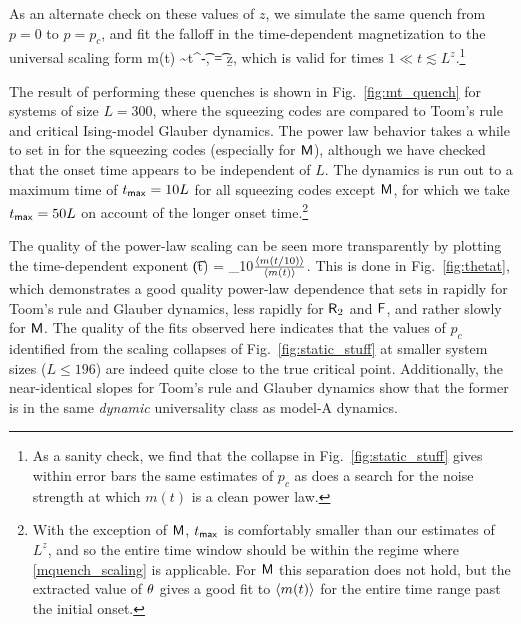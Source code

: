 \documentclass[pra,aps,twocolumn,groupedaddress,superscriptaddress,nofootinbib,preprintnumbers]{revtex4-2}
\begin{document}
		As an alternate check on these values of $z$,  we simulate the same quench from $p=0$ to $p=p_c$, and fit the falloff in the time-dependent magnetization to the universal scaling form \cite{janssen1989new,hinrichsen2000non}
	\be\label{mquench_scaling}  m(t)  \sim t^{-\t}, \qq \t = \frac\b{\nu z},\ee
	which is valid for times $1 \ll t \lesssim L^z$.\footnote{As a sanity check, we find that the collapse in Fig.~\ref{fig:static_stuff} gives within error bars the same estimates of $p_c$ as does a search for the noise strength at which $m(t)$ is a clean power law. }
	
	The result of performing these quenches is shown in Fig.~\ref{fig:mt_quench} for systems of size $L=300$, where the squeezing codes are compared to Toom's rule and critical Ising-model Glauber dynamics. The power law behavior takes a while to set in for the squeezing codes (especially for $\mathsf{M}$), although we have checked that the onset time appears to be independent of $L$. The dynamics is run out to a maximum time of $t_{\sf max} = 10L$ for all squeezing codes except $\mathsf{M}$, for which we take $t_{\sf max} = 50L$ on account of the longer onset time.\footnote{With the exception of $\mathsf{M}$, $t_{\sf max}$ is comfortably smaller 
	than our estimates of $L^z$, and so the entire time window should be within the regime where \eqref{mquench_scaling} is applicable. For $\mathsf{M}$ this separation does not hold, but the extracted value of $\theta$ gives a good fit to $\langle m(t)\rangle$ for the entire time range past the initial onset. }
	
	The quality of the power-law scaling can be seen more transparently by plotting the time-dependent exponent 
	\be \label{thetadef} \t(t) = \log_{10}\(\frac{\lan m(t/10)\ran}{\lan m(t)\ran}\).\ee 
	This is done in Fig.~\ref{fig:thetat}, which demonstrates a good quality power-law dependence that sets in rapidly for Toom's rule and Glauber dynamics, less rapidly for $\mathsf{R}_{2}$ and $\mathsf{F}$, and rather slowly for $\mathsf{M}$. The quality of the fits observed here indicates that the values of $p_c$ identified from the scaling collapses of Fig.~\ref{fig:static_stuff} at smaller system sizes ($L\leq 196$) are indeed quite close to the true critical point. Additionally, the near-identical slopes for Toom's rule and Glauber dynamics show that the former is in the same {\it dynamic} universality class as model-A dynamics. 
	
\end{document}
